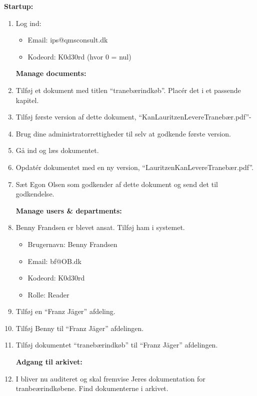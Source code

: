 \textbf{Startup:}
\begin{enumerate}
	\item Log ind:
		\begin{itemize}
			\item Email: ips@qmsconsult.dk
			\item Kodeord: K0d30rd   (hvor 0 = nul)
		\end{itemize}

\textbf{Manage documents:}
	\item Tilføj et dokument med titlen “tranebærindkøb”. Placér det i et passende kapitel.
	\item Tilføj første version af dette dokument, “KanLauritzenLevereTranebær.pdf”-
	\item Brug dine administratorrettigheder til selv at godkende første version.
	\item Gå ind og læs dokumentet.
	\item Opdatér dokumentet med en ny version, “LauritzenKanLevereTranebær.pdf”.
	\item Sæt Egon Olsen som godkender af dette dokument og send det til godkendelse.

\textbf{Manage users \& departments:}
	\item Benny Frandsen er blevet ansat. Tilføj ham i systemet.
		\begin{itemize}
			\item Brugernavn: Benny Frandsen
			\item Email: bf@OB.dk
			\item Kodeord: K0d30rd
			\item Rolle: Reader
		\end{itemize}
	\item Tilføj en “Franz Jäger” afdeling.
	\item Tilføj Benny til “Franz Jäger” afdelingen.
	\item Tilføj dokumentet “tranebærindkøb” til “Franz Jäger” afdelingen.

\textbf{Adgang til arkivet:}
	\item I bliver nu auditeret og skal fremvise Jeres dokumentation for tranbeærindkøbene. Find dokumenterne i arkivet.
\end{enumerate}